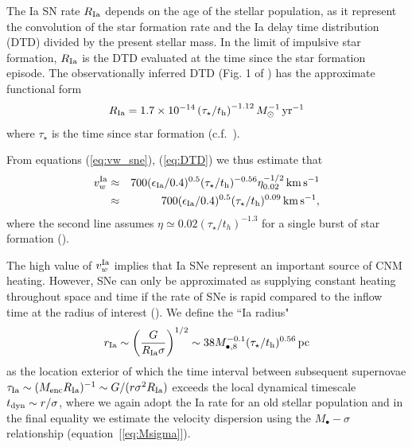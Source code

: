 \documentclass[usenatbib,fleqn]{mn2e}
\newcommand{\RateIa}{R_{\rm Ia}}
\begin{document}
The Ia SN rate $\RateIa$ depends on the age of the stellar population, as it represent the convolution of the star formation rate and the Ia delay time distribution (DTD) divided by the present stellar mass.  In
the limit of impulsive star formation, $\RateIa$ is the DTD evaluated at the time since the star formation episode.  The observationally inferred DTD (Fig. 1 of \citealt{MaozMannucci+:2012a}) has the
approximate functional form \begin{align}
  R_{\rm Ia} =1.7\times 10^{-14}\left(\tau_{\star}/t_{\rm
      h}\right)^{-1.12} M_{\odot}^{-1}\,{\rm yr^{-1}}
\label{eq:DTD}
  \end{align}
  where $\tau_{\star}$ is the time since star formation
  (c.f.~\citealt{Scannapieco&Bildsten05}). 

From equations (\ref{eq:vw_sne}), (\ref{eq:DTD}) we thus estimate that 
  \begin{eqnarray} 
    v_{w}^{\rm Ia} &\approx& 700(\epsilon_{\rm
      Ia}/0.4)^{0.5}(\tau_{\star}/t_{\rm h})^{-0.56}\eta_{0.02}^{-1/2}\,{\rm km
      \,s^{-1}} \nonumber \\
&\approx& 700(\epsilon_{\rm
      Ia}/0.4)^{0.5}(\tau_{\star}/t_{\rm h})^{0.09}\,{\rm km
      \,s^{-1}},
\label{eq:vIa}
  \end{eqnarray}
where the second line assumes $\eta\simeq 0.02 (\tau_{\star}/t_h)^{-1.3}$ for a single burst of star formation (\citealt{Ciotti+91}).

The high value of $v_{w}^{\rm Ia}$ implies that Ia SNe represent an important source of CNM heating.  However, SNe can only be approximated as supplying constant heating throughout space and time if the rate of SNe is rapid compared to the inflow time at the radius of interest (\citealt{ShcherbakovWong+:2014a}).  We define the ``Ia radius"
  \begin{align}
    r_{\rm Ia} \sim \left(\frac{G}{R_{\rm Ia}\sigma}\right)^{1/2} \sim
    38 M_{\bullet,8}^{-0.1}(\tau_{\star}/t_{\rm h})^{0.56}\,{\rm pc}
    \label{eq:rIa}
  \end{align}
as the location exterior of which the time interval between subsequent supernovae $\tau_{\rm Ia} \sim (M_{\rm enc}R_{\rm Ia})^{-1} \sim G/(r\sigma^{2}R_{\rm Ia})$ exceeds the local dynamical timescale $t_{\rm
dyn} \sim r/\sigma$, where we again adopt the Ia rate for an old stellar population and in the final equality we estimate the velocity dispersion using the $M_{\bullet}-\sigma$ relationship
(equation~[\ref{eq:Msigma}]).  
\end{document}
